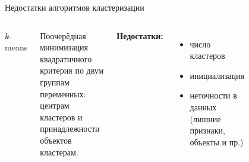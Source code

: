 \documentclass[aspectratio=169,tikz]{beamer}
\newcommand{\kmeans}{\mbox{$ k $-means}\xspace}
\begin{document}
	\begin{frame}{Недостатки алгоритмов кластеризации}
	
	\begin{columns}
		
		
		\begin{center}
			{\Huge \kmeans}
		\end{center}
		
		\parbox{\linewidth}{
			Поочерёдная минимизация квадратичного критерия по двум группам переменных: центрам кластеров и принадлежности объектов кластерам.
		}
		
		\vspace*{1\baselineskip} 
		\textbf{Недостатки:}
		\begin{itemize}
			\item число кластеров
			\item инициализация
			\item неточности в данных\\ (лишние признаки, объекты и пр.)
		\end{itemize}
		
		\centering
		\vspace{-.4cm}
		\begin{figure} %
			\centering
			
		\end{figure}
	\end{columns} 
	
	\end{frame}
\end{document}
